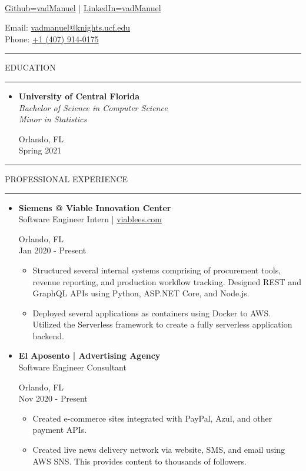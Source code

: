 \documentclass{article}
\makeatletter
\newcommand{\name}{Manuel Vasquez}
\newcommand{\website}{\href{https://www.github.com/vadmanuel}{Github=vadManuel} | \href{https://www.linkedin.com/in/vadmanuel}{LinkedIn=vadManuel}}
\newcommand{\email}{\href{mailto:vadmanuel@knights.ucf.edu}{vadmanuel@knights.ucf.edu}}
\newcommand{\phone}{\href{tel:+14079140175}{+1 (407) 914-0175}}
\newcommand{\makeminipage}[4]{
    \begin{minipage}[c]{.7\linewidth} 
        \flushleft #1 \\ #2
    \end{minipage} \hfill
    \begin{minipage}[c]{.29\linewidth}
        \flushright #3 \\ #4
    \end{minipage}
}
\newcommand{\makesection}[1]{\hrule\vskip1mm\uppercase{#1}\vskip1mm\hrule}
\makeatother
\begin{document}
\setlength{\parindent}{0cm}

\makeminipage
    {{\large\textbf{\name}}}
    {\website}
    {Email: \email}
    {Phone: \phone}
\bigbreak

\makesection{Education}
\begin{itemize}[leftmargin=.35cm]
    \item {
    \makeminipage
        {\textbf{University of Central Florida}}
        {\textit{Bachelor of Science in Computer Science} \\
        \textit{Minor in Statistics}}
        {Orlando, FL}
        {Spring 2021}
    }
\end{itemize}

\begin{minipage}[t]{.69\linewidth}
    \makesection{Professional Experience}
    \begin{itemize}[leftmargin=.35cm]

        \item \makeminipage
            {\textbf{Siemens @ Viable Innovation Center}}
            {Software Engineer Intern | \href{https://wwww.viablees.com}{viablees.com}}
            {Orlando, FL}
            {Jan 2020 - Present}
            \vspace*{-1.5mm}
            \raggedright
            \begin{itemize}[leftmargin=.35cm]
                \item Structured several internal systems comprising of procurement tools, revenue reporting, and production workflow tracking. Designed REST and GraphQL APIs using Python, ASP.NET Core, and Node.js.
                \item Deployed several applications as containers using Docker to AWS. Utilized the Serverless framework to create a fully serverless application backend.
            \end{itemize}

        \item \makeminipage
            {\textbf{El Aposento | Advertising Agency}}
            {Software Engineer Consultant}
            {Orlando, FL}
            {Nov 2020 - Present}
            \vspace*{-1.5mm}
            \raggedright
            \begin{itemize}[leftmargin=.35cm]
                \item Created e-commerce sites integrated with PayPal, Azul, and other payment APIs.
                \item Created live news delivery network via website, SMS, and email using AWS SNS. This provides content to thousands of followers.
            \end{itemize}


\end{itemize}
\end{minipage}
\end{document}
